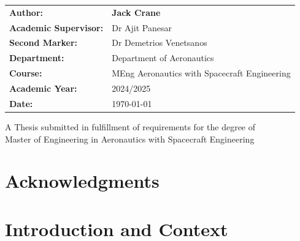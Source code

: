 \documentclass[11pt,a4paper]{report}
\begin{document}
\begin{titlepage}
\begin{center}
        \begin{center}
            \renewcommand{\arraystretch}{1.5}
            \hfill\begin{tabular}{p{} p{}}
                \textbf{Author:}\hfill               & \textbf{Jack Crane} \\ 
                \textbf{Academic Supervisor:}\hfill  & Dr Ajit Panesar \\ 
                \textbf{Second Marker:}\hfill        & Dr Demetrios Venetsanos \\ 
                \textbf{Department:}\hfill           & Department of Aeronautics \\
                \textbf{Course:}\hfill               & MEng Aeronautics with Spacecraft Engineering \\
                \textbf{Academic Year:}\hfill        & 2024/2025 \\
                \textbf{Date:}\hfill                 & \today \\
            \end{tabular}
        \end{center}
        
        \vspace{0.5cm} %
        A Thesis submitted in fulfillment of requirements for the degree of \\
        Master of Engineering in Aeronautics with Spacecraft Engineering
    \end{center}
\end{titlepage}

\begin{abstract}

\end{abstract}

\chapter*{Acknowledgments}


\tableofcontents
\listoffigures
\listoftables

\newpage

\clearpage
{}

\chapter{Introduction and Context}

\end{document}
